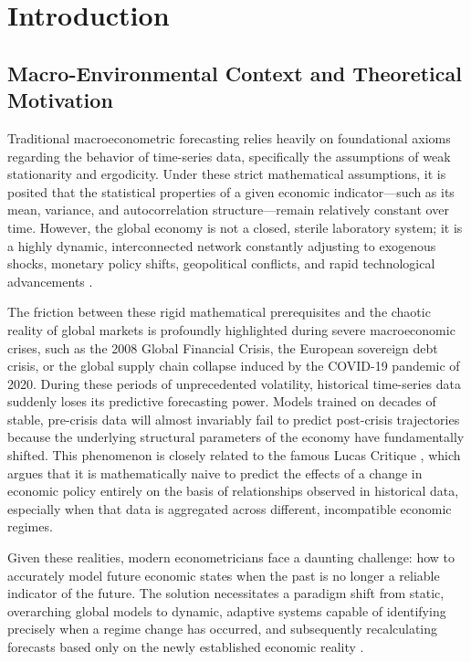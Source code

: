 \documentclass[11pt, a4paper]{report}
\begin{document}
\chapter{Introduction}
\label{ch:introduction}

\section{Macro-Environmental Context and Theoretical Motivation}
Traditional macroeconometric forecasting relies heavily on foundational axioms regarding the behavior of time-series data, specifically the assumptions of weak stationarity and ergodicity. Under these strict mathematical assumptions, it is posited that the statistical properties of a given economic indicator—such as its mean, variance, and autocorrelation structure—remain relatively constant over time. However, the global economy is not a closed, sterile laboratory system; it is a highly dynamic, interconnected network constantly adjusting to exogenous shocks, monetary policy shifts, geopolitical conflicts, and rapid technological advancements \cite{ClementsHendry1998}. 

The friction between these rigid mathematical prerequisites and the chaotic reality of global markets is profoundly highlighted during severe macroeconomic crises, such as the 2008 Global Financial Crisis, the European sovereign debt crisis, or the global supply chain collapse induced by the COVID-19 pandemic of 2020. During these periods of unprecedented volatility, historical time-series data suddenly loses its predictive forecasting power. Models trained on decades of stable, pre-crisis data will almost invariably fail to predict post-crisis trajectories because the underlying structural parameters of the economy have fundamentally shifted. This phenomenon is closely related to the famous Lucas Critique \cite{Lucas1976}, which argues that it is mathematically naive to predict the effects of a change in economic policy entirely on the basis of relationships observed in historical data, especially when that data is aggregated across different, incompatible economic regimes.

Given these realities, modern econometricians face a daunting challenge: how to accurately model future economic states when the past is no longer a reliable indicator of the future. The solution necessitates a paradigm shift from static, overarching global models to dynamic, adaptive systems capable of identifying precisely when a regime change has occurred, and subsequently recalculating forecasts based only on the newly established economic reality \cite{Pesaran2004}.
\end{document}
